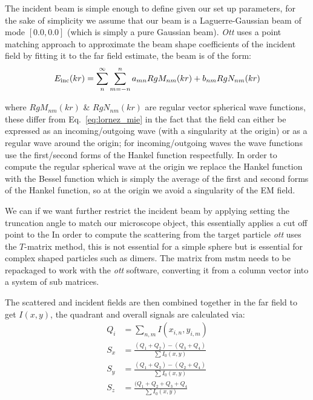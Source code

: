 The incident beam is simple enough to define given our set up parameters, 
for the sake of simplicity we assume that our beam is a Laguerre-Gaussian 
beam of mode $[0.0, 0.0]$ (which is simply a pure Gaussian beam). 
\textit{Ott} uses a point matching approach to approximate the beam shape 
coefficients of the incident field by fitting it to the far field estimate, 
the beam is of the form:
\begin{align}
	E_{\rm inc}(kr)=\sum^\infty_n\sum^n_{m=-n}a_{mn}RgM_{nm}(kr)+b_{nm}RgN_{nm}(kr)
\end{align}

where $RgM_{nm}(kr)$ \& $RgN_{nm}(kr)$ are regular vector spherical wave 
functions, these differ from Eq.~\ref{eq:lornez_mie} in the fact that the 
field can either be expressed as an incoming/outgoing wave (with a 
singularity at the origin) or as a regular wave around the origin; for 
incoming/outgoing waves the wave functions use the first/second forms of 
the Hankel function respectfully. In order to compute the regular spherical 
wave at the origin we replace the Hankel function with the Bessel function 
which is simply the average of the first and second forms of the Hankel 
function, so at the origin we avoid a singularity of the EM field.  

We can if we want further restrict the incident beam by applying setting 
the truncation angle to match our microscope object, this essentially 
applies a cut off point to the In order to compute the scattering from 
the target particle \textit{ott} uses the $T$-matrix method, this is not 
essential for a simple sphere but is essential for complex shaped particles 
such as dimers. The matrix from mstm needs to be repackaged to work with the
\textit{ott} software, converting it from a column vector into a system of 
sub matrices. 

The scattered and incident fields are then combined together 
in the far field to get $I(x,y)$, the quadrant and overall signals are 
calculated via:
\begin{align}
	Q_i &= \sum_{n,m} I(x_{i,n}, y_{i,m}) \\
	S_{x} &= \frac{(Q_1+Q_2)-(Q_3+Q_4)}{\sum I_0(x,y)} \\
	S_{y} &= \frac{(Q_1+Q_3)-(Q_2+Q_4)}{\sum I_0(x,y)} \\
	S_{z} &= \frac{(Q_1+Q_2+Q_3+Q_4}{\sum I_0(x,y)}
\end{align}

